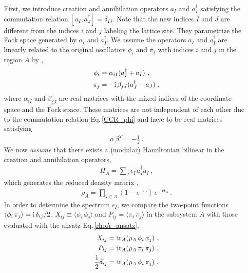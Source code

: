 First, we introduce creation and annihilation operators $a_I$ and $a_I^\dagger$ satisfying the commutation relation $[a_I, a_J^\dagger] = \delta_{IJ}$.
Note that the new indices $I$ and $J$ are different from the indices $i$ and $j$ labeling the lattice site.
They parametrize the Fock space generated by $a_I$ and $a_I^\dagger$.
We assume the operators $a_I$ and $ a_I^\dagger$ are linearly related to the original oscillators $\phi_i$ and $ \pi_j$ with indices $i$ and $j$ in the region $A$ by \cite{Casini:2009sr},
\begin{align}\label{Phi_to_a}
\begin{aligned}
	\phi_i &= \alpha_{iI} (a_{I}^\dagger + a_{I}) \ , \\
	\pi_j &= -\mathrm{i}\, \beta_{jJ} (a_J^\dagger - a_J) \  ,
\end{aligned}
\end{align}
where $\alpha_{iI}$ and $\beta_{jJ}$ are real matrices with the mixed indices of the coordinate space and the Fock space.
These matrices are not independent of each other due to the commutation relation Eq.\,\eqref{CCR_phi} and have to be real matrices satisfying
\begin{align}\label{alphabet}
\alpha\, \beta^T = -\frac{1}{2} \ .
\end{align}
We now {\it assume} that there exists a (modular) Hamiltonian bilinear in the creation and annihilation operators,
\begin{align}
	H_A= \sum_{I} \epsilon_I\, a^\dagger_I a_I \ ,
\end{align}
which generates the reduced density matrix \cite{peschel1999density,chung2000density},
\begin{align}\label{rhoA_ansatz}
\rho_A = \prod_{I\in A} (1 - e^{-\epsilon_I}) \, e^{-H_A} \ .
\end{align}
In order to determine the spectrum $\epsilon_I$, we compare the two-point functions $\langle \phi_i\, \pi_j\rangle = \mathrm{i}\, \delta_{ij}/2$, $X_{ij} \equiv \langle \phi_i \,\phi_j\rangle$ and $P_{ij} = \langle \pi_i \,\pi_j\rangle$ in the subsystem $A$ with those evaluated with the ansatz Eq.\,\eqref{rhoA_ansatz},
\begin{align}\label{XPD}
\begin{aligned}
X_{ij} &= {\rm tr}_A (\rho_A\, \phi_i \,\phi_j) \ , \\
P_{ij} &= {\rm tr}_A (\rho_A\, \pi_i\, \pi_j) \ , \\
\frac{\mathrm{i}}{2}\delta_{ij}  &= {\rm tr}_A (\rho_A\, \phi_i\, \pi_j) \ .
\end{aligned}
\end{align}
